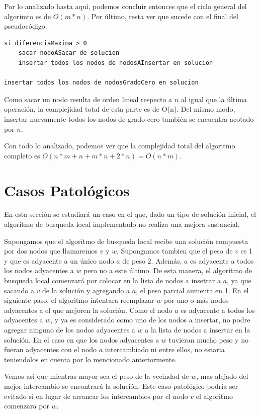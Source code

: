 \documentclass[a4paper,11pt] {article}
\begin{document}
Por lo analizado hasta aquí, podemos concluir entonces que el ciclo general del algorimto es de $O(m*n)$. Por último, resta ver que sucede con el final del pseudocódigo.

\begin{verbatim}
si diferenciaMaxima > 0
    sacar nodoASacar de solucion
    insertar todos los nodos de nodosAInsertar en solucion

insertar todos los nodos de nodosGradoCero en solucion
\end{verbatim}

Como sacar un nodo resulta de orden lineal respecto a $n$ al igual que la última operación, la complejidad total de esta parte es de O(n). Del mismo modo, insertar nuevamente todos los nodos de grado cero también se encuentra acotado por $n$.

Con todo lo analizado, podemos ver que la complejidad total del algoritmo completo es $O(n*m + n + m*n + 2*n) = O(n*m)$.

\section*{Casos Patol\'ogicos}

En esta secci\'on se estudiar\'a un caso en el que, dado un tipo de soluci\'on inicial, el algoritmo de busqueda local implementado no realiza una mejora sustancial.

Supongamos que el algoritmo de busqueda local recibe una soluci\'on compuesta por dos nodos que llamaremos $v$ y $w$. Supongamos tambien que el peso de $v$ es 1 y que es adyacente a un \'unico nodo $a$ de peso 2. Adem\'as, $a$ es adyacente a todos los nodos adyacentes a $w$ pero no a este \'ultimo. De esta manera, el algoritmo de busqueda local comenzar\'a por colocar en la lista de nodos a insetrar a $a$, ya que sacando a $v$ de la soluci\'on y agregando a $a$, el peso parcial aumenta en 1. En el siguiente paso, el algoritmo intentara reemplazar $w$ por uno o m\'as nodos adyacentes a el que mejoren la soluci\'on. Como el nodo $a$ es adyacente a todos los adyacentes a $w$, y ya es considerado como uno de los nodos a insertar, no podre agregar ninguno de los nodos adyacentes a $w$ a la lista de nodos a insertar en la soluci\'on. En el caso en que los nodos adyacentes a $w$ tuvieran mucho peso y no fueran adyacentes con el nodo $a$ intercambiado ni entre ellos, no estaria teniendolos en cuenta por lo mencionado anteriormente.

Vemos asi que mientras mayor sea el peso de la vecindad de $w$, mas alejado del mejor intercambio se encontrar\'a la soluci\'on. Este caso patol\'ogico podria ser evitado si en lugar de arrancar los intercambios por el nodo $v$ el algoritmo comenzara por $w$.
\end{document}
